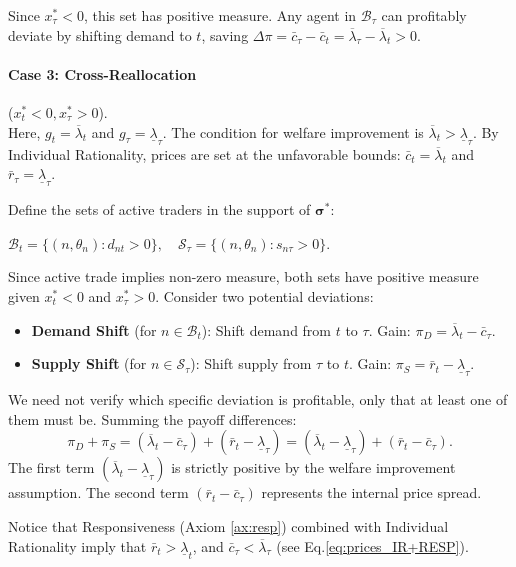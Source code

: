 \documentclass[12pt, notitlepage]{article}
\begin{document}
    Since $x_\tau^* < 0$, this set has positive measure. Any agent in $\mathcal{B}_\tau$ can profitably deviate by shifting demand to $t$, saving $\Delta \pi = \bar{c}_\tau - \bar{c}_t = \overline{\lambda}_\tau - \overline{\lambda}_t > 0$.

\paragraph{Case 3: Cross-Reallocation} ($x_t^* < 0, x_\tau^* > 0$). \\
    Here, $g_t = \overline{\lambda}_t$ and $g_\tau = \underline{\lambda}_\tau$. The condition for welfare improvement is $\overline{\lambda}_t > \underline{\lambda}_\tau$.
    By Individual Rationality, prices are set at the unfavorable bounds: $\bar{c}_t = \overline{\lambda}_t$ and $\bar{r}_\tau = \underline{\lambda}_\tau$.
    
    Define the sets of active traders in the support of $\boldsymbol{\sigma}^*$: 
    
    $ \mathcal{B}_t = \{(n,\theta_n): d_{nt} > 0\}, \quad \mathcal{S}_\tau = \{(n,\theta_n): s_{n\tau} > 0\}.$
    
    Since active trade implies non-zero measure, both sets have positive measure given $x_t^* < 0$ and $x_\tau^* > 0$. Consider two potential deviations:
    \begin{itemize}
        \item \textbf{Demand Shift} (for $n \in \mathcal{B}_t$): Shift demand from $t$ to $\tau$. Gain: $\pi_D = \overline{\lambda}_t - \bar{c}_\tau$.
        \item \textbf{Supply Shift} (for $n \in \mathcal{S}_\tau$): Shift supply from $\tau$ to $t$. Gain: $\pi_S = \bar{r}_t - \underline{\lambda}_\tau$.
    \end{itemize}
    We need not verify which specific deviation is profitable, only that at least one of them must be. Summing the payoff differences:
    \[
    \pi_D + \pi_S = (\overline{\lambda}_t - \bar{c}_\tau) + (\bar{r}_t - \underline{\lambda}_\tau) = (\overline{\lambda}_t - \underline{\lambda}_\tau) + (\bar{r}_t - \bar{c}_\tau).
    \]
    The first term $(\overline{\lambda}_t - \underline{\lambda}_\tau)$ is strictly positive by the welfare improvement assumption.
    The second term $(\bar{r}_t - \bar{c}_\tau)$ represents the internal price spread. 
    
    Notice that Responsiveness (Axiom \ref{ax:resp}) combined with Individual Rationality imply that $\bar{r}_t > \underline{\lambda}_t$, and $\bar{c}_\tau < \overline{\lambda}_\tau$ (see  Eq.\ref{eq:prices_IR+RESP}).  
    
\end{document}
